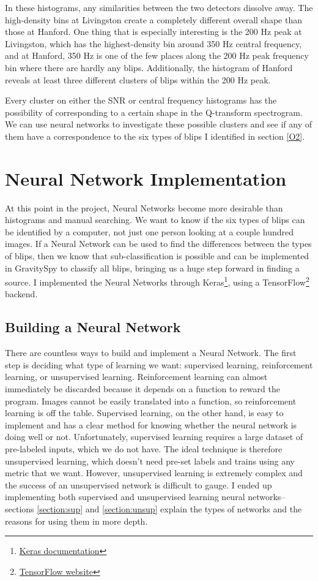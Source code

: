\documentclass[a4paper]{article}
\begin{document}
In these histograms, any similarities between the two detectors dissolve away. The high-density bins at Livingston create a completely different overall shape than those at Hanford. One thing that is especially interesting is the 200 Hz peak at Livingston, which has the highest-density bin around 350 Hz central frequency, and at Hanford, 350 Hz is one of the few places along the 200 Hz peak frequency bin where there are hardly any blips. Additionally, the histogram of Hanford reveals at least three different clusters of blips within the 200 Hz peak. 

Every cluster on either the SNR or central frequency histograms has the possibility of corresponding to a certain shape in the Q-transform spectrogram. We can use neural networks to investigate these possible clusters and see if any of them have a correspondence to the six types of blips I identified in section \ref{O2}. 

\section{Neural Network Implementation}

At this point in the project, Neural Networks become more desirable than histograms and manual searching. We want to know if the six types of blips can be identified by a computer, not just one person looking at a couple hundred images. If a Neural Network can be used to find the differences between the types of blips, then we know that sub-classification is possible and can be implemented in GravitySpy to classify all blips, bringing us a huge step forward in finding a source. I implemented the Neural Networks through Keras\footnote{\href{https://keras.io}{Keras documentation}}, using a TensorFlow\footnote{\href{https://www.tensorflow.org}{TensorFlow website}} backend.

\subsection{Building a Neural Network} \label{section:build_nn}

There are countless ways to build and implement a Neural Network. The first step is deciding what type of learning we want: supervised learning, reinforcement learning, or unsupervised learning. Reinforcement learning can almost immediately be discarded because it depends on a function to reward the program. Images cannot be easily translated into a function, so reinforcement learning is off the table. Supervised learning, on the other hand, is easy to implement and has a clear method for knowing whether the neural network is doing well or not. Unfortunately, supervised learning requires a large dataset of pre-labeled inputs, which we do not have. The ideal technique is therefore unsupervised learning, which doesn't need pre-set labels and trains using any metric that we want. However, unsupervised learning is extremely complex and the success of an unsupervised network is difficult to gauge. I ended up implementing both supervised and unsupervised learning neural networks--sections \ref{section:sup} and \ref{section:unsup} explain the types of networks and the reasons for using them in more depth.
\end{document}
